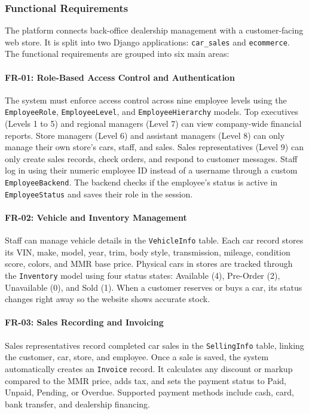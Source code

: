 \subsubsection{Functional Requirements}
The platform connects back-office dealership management with a customer-facing web store. It is split into two Django applications: \texttt{car\_sales} and \texttt{ecommerce}. The functional requirements are grouped into six main areas:

\paragraph{FR-01: Role-Based Access Control and Authentication}
The system must enforce access control across nine employee levels using the \texttt{EmployeeRole}, \texttt{EmployeeLevel}, and \texttt{EmployeeHierarchy} models. Top executives (Levels 1 to 5) and regional managers (Level 7) can view company-wide financial reports. Store managers (Level 6) and assistant managers (Level 8) can only manage their own store's cars, staff, and sales. Sales representatives (Level 9) can only create sales records, check orders, and respond to customer messages. Staff log in using their numeric employee ID instead of a username through a custom \texttt{EmployeeBackend}. The backend checks if the employee's status is active in \texttt{EmployeeStatus} and saves their role in the session.

\paragraph{FR-02: Vehicle and Inventory Management}
Staff can manage vehicle details in the \texttt{VehicleInfo} table. Each car record stores its VIN, make, model, year, trim, body style, transmission, mileage, condition score, colors, and MMR base price. Physical cars in stores are tracked through the \texttt{Inventory} model using four status states: Available (4), Pre-Order (2), Unavailable (0), and Sold (1). When a customer reserves or buys a car, its status changes right away so the website shows accurate stock.

\paragraph{FR-03: Sales Recording and Invoicing}
Sales representatives record completed car sales in the \texttt{SellingInfo} table, linking the customer, car, store, and employee. Once a sale is saved, the system automatically creates an \texttt{Invoice} record. It calculates any discount or markup compared to the MMR price, adds tax, and sets the payment status to Paid, Unpaid, Pending, or Overdue. Supported payment methods include cash, card, bank transfer, and dealership financing.

